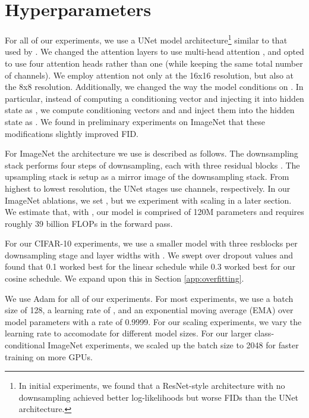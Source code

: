 \documentclass{article}
\begin{document}



\clearpage

\appendix

\section{Hyperparameters}
\label{app:hyperparameters}

For all of our experiments, we use a UNet model architecture\footnote{In initial experiments, we found that a ResNet-style architecture with no downsampling achieved better log-likelihoods but worse FIDs than the UNet architecture.} similar to that used by \citet{ddpm}. We changed the attention layers to use multi-head attention \citep{transformers}, and opted to use four attention heads rather than one (while keeping the same total number of channels). We employ attention not only at the 16x16 resolution, but also at the 8x8 resolution. Additionally, we changed the way the model conditions on . In particular, instead of computing a conditioning vector  and injecting it into hidden state  as , we compute conditioning vectors  and  and inject them into the hidden state as . We found in preliminary experiments on ImageNet  that these modifications slightly improved FID.

For ImageNet  the architecture we use is described as follows. The downsampling stack performs four steps of downsampling, each with three residual blocks \citep{resnet}. The upsampling stack is setup as a mirror image of the downsampling stack. From highest to lowest resolution, the UNet stages use  channels, respectively. In our ImageNet  ablations, we set , but we experiment with scaling  in a later section. We estimate that, with , our model is comprised of 120M parameters and requires roughly 39 billion FLOPs in the forward pass.

For our CIFAR-10 experiments, we use a smaller model with three resblocks per downsampling stage and layer widths  with . We swept over dropout values  and found that 0.1 worked best for the linear schedule while 0.3 worked best for our cosine schedule. We expand upon this in Section \ref{app:overfitting}.

We use Adam \citep{adam} for all of our experiments. For most experiments, we use a batch size of 128, a learning rate of , and an exponential moving average (EMA) over model parameters with a rate of 0.9999. For our scaling experiments, we vary the learning rate to accomodate for different model sizes. For our larger class-conditional ImageNet  experiments, we scaled up the batch size to 2048 for faster training on more GPUs.
\end{document}
